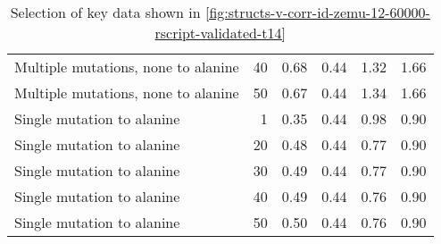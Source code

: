\begin{table}
\begin{tabular}{lrrrrr}
 Multiple mutations, none to alanine &          40 &          0.68 &                    0.44 &            1.32 &                      1.66 \\
 Multiple mutations, none to alanine &          50 &          0.67 &                    0.44 &            1.34 &                      1.66 \\
          Single mutation to alanine &           1 &          0.35 &                    0.44 &            0.98 &                      0.90 \\
          Single mutation to alanine &          20 &          0.48 &                    0.44 &            0.77 &                      0.90 \\
          Single mutation to alanine &          30 &          0.49 &                    0.44 &            0.77 &                      0.90 \\
          Single mutation to alanine &          40 &          0.49 &                    0.44 &            0.76 &                      0.90 \\
          Single mutation to alanine &          50 &          0.50 &                    0.44 &            0.76 &                      0.90 \\
\bottomrule
\end{tabular}

\caption[]{Selection of key data shown in \cref{fig:structs-v-corr-id-zemu-12-60000-rscript-validated-t14}}
\label{tab:structs-v-corr-id-zemu-12-60000-rscript-validated-t14-underlying-data}
\end{table}
